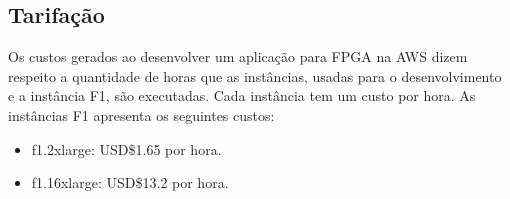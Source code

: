 \subsection{Tarifação} \label{sec:tarifacao}

Os custos gerados ao desenvolver um aplicação para FPGA na AWS dizem respeito a quantidade de horas que as instâncias, usadas para o desenvolvimento e a instância F1, são executadas. Cada instância tem um custo por hora. As instâncias F1 apresenta os seguintes custos:

\begin{itemize}
    \item f1.2xlarge: USD\$1.65 por hora.
    
    \item f1.16xlarge: USD\$13.2 por hora.
\end{itemize}


    



